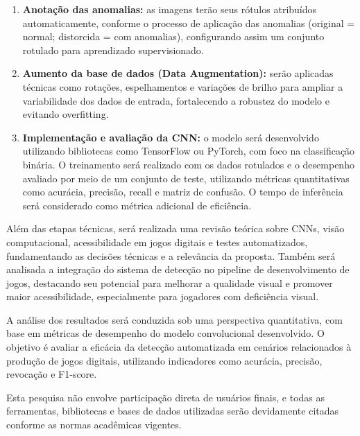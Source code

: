 \begin{enumerate}
    \item \textbf{Anotação das anomalias:} as imagens terão seus rótulos atribuídos automaticamente, conforme o processo de aplicação das anomalias (original = normal; distorcida = com anomalias), configurando assim um conjunto rotulado para aprendizado supervisionado.
    
    \item \textbf{Aumento da base de dados (Data Augmentation):} serão aplicadas técnicas como rotações, espelhamentos e variações de brilho para ampliar a variabilidade dos dados de entrada, fortalecendo a robustez do modelo e evitando overfitting.
    
    \item \textbf{Implementação e avaliação da CNN:} o modelo será desenvolvido utilizando bibliotecas como TensorFlow ou PyTorch, com foco na classificação binária. O treinamento será realizado com os dados rotulados e o desempenho avaliado por meio de um conjunto de teste, utilizando métricas quantitativas como acurácia, precisão, recall e matriz de confusão. O tempo de inferência será considerado como métrica adicional de eficiência.
\end{enumerate}

Além das etapas técnicas, será realizada uma revisão teórica sobre CNNs, visão computacional, acessibilidade em jogos digitais e testes automatizados, fundamentando as decisões técnicas e a relevância da proposta. Também será analisada a integração do sistema de detecção no pipeline de desenvolvimento de jogos, destacando seu potencial para melhorar a qualidade visual e promover maior acessibilidade, especialmente para jogadores com deficiência visual.

A análise dos resultados será conduzida sob uma perspectiva quantitativa, com base em métricas de desempenho do modelo convolucional desenvolvido. O objetivo é avaliar a eficácia da detecção automatizada em cenários relacionados à produção de jogos digitais, utilizando indicadores como acurácia, precisão, revocação e F1-score.

Esta pesquisa não envolve participação direta de usuários finais, e todas as ferramentas, bibliotecas e bases de dados utilizadas serão devidamente citadas conforme as normas acadêmicas vigentes.

